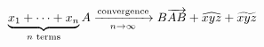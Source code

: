 \begin{equation*}
 \underbrace{x_1+\cdots+x_n}
            _{n\text{ terms}}\\
 A\xrightarrow[n\to\infty]
              {\text{convergence}}B\\
 \overrightarrow{AB}
 +\widehat{xyz}+\widetilde{xyz}
\end{equation*}
